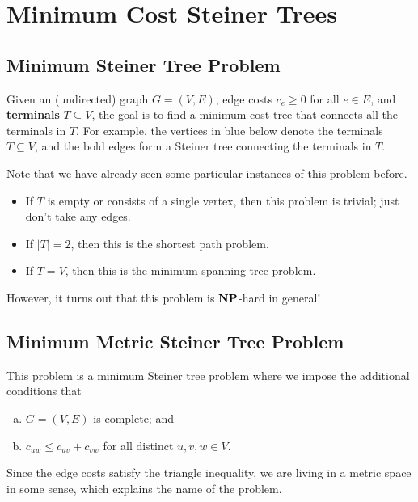 \section{Minimum Cost Steiner Trees} \label{sec:5}

\subsection{Minimum Steiner Tree Problem}
Given an (undirected) graph $G = (V, E)$, edge costs $c_e \geq 0$ for all 
$e \in E$, and {\bf terminals} $T \subseteq V$, the goal is to find a 
minimum cost tree that connects all the terminals in $T$. For example, 
the vertices in blue below denote the terminals $T \subseteq V$, 
and the bold edges form a Steiner tree connecting the terminals in $T$. 
\begin{center}
\end{center}
\vspace{-0.25cm}
Note that we have already seen some particular instances of this problem before.
\begin{itemize}
    \item If $T$ is empty or consists of a single vertex, then this problem is 
    trivial; just don't take any edges.
    \item If $|T| = 2$, then this is the shortest path problem.
    \item If $T = V$, then this is the minimum spanning tree problem.
\end{itemize}
However, it turns out that this problem is $\mathbf{NP}$-hard in general!

\subsection{Minimum Metric Steiner Tree Problem} \label{subsec:5.2}
This problem is a minimum Steiner tree problem where we impose the additional 
conditions that
\begin{enumerate}[(a)]
    \item $G = (V, E)$ is complete; and 
    \item $c_{uw} \leq c_{uv} + c_{vw}$ for all distinct $u, v, w \in V$.
\end{enumerate}
Since the edge costs satisfy the triangle inequality, we are living 
in a metric space in some sense, which explains the name of the problem.

